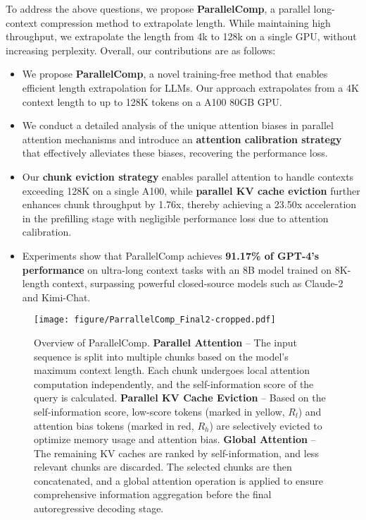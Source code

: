 To address the above questions, we propose \textbf{ParallelComp}, a parallel long-context compression method to extrapolate length. While maintaining high throughput, we extrapolate the length from 4k to 128k on a single GPU, without increasing perplexity. Overall, our contributions are as follows:
\begin{itemize}
    \item  We propose \textbf{ParallelComp}, a novel training-free method that enables efficient length extrapolation for LLMs. Our approach extrapolates from a 4K context length to up to 128K tokens on a A100 80GB GPU.

        \item We conduct a detailed analysis of the unique attention biases in parallel attention mechanisms and introduce an \textbf{attention calibration strategy} that effectively alleviates these biases, recovering the performance loss.
        
         \item Our \textbf{chunk eviction strategy} enables parallel attention to handle contexts exceeding 128K on a single A100, while \textbf{parallel KV cache eviction} further enhances chunk throughput by 1.76x, thereby achieving a 23.50x acceleration in the prefilling stage with negligible performance loss due to attention calibration.
         
     \item Experiments show that ParallelComp achieves \textbf{91.17\% of GPT-4's performance} on ultra-long context tasks with an 8B model trained on 8K-length context, surpassing powerful closed-source models such as Claude-2 and Kimi-Chat.

     

    
   
\end{itemize}

\begin{figure*}[!h]
\vskip 0.2in
\begin{center}
\centerline{\texttt{[image: figure/ParrallelComp\_Final2-cropped.pdf]}}
\caption{Overview of ParallelComp. \textbf{Parallel Attention} – The input sequence is split into multiple chunks based on the model's maximum context length. Each chunk undergoes local attention computation independently, and the self-information score of the query is calculated. \textbf{Parallel KV Cache Eviction} – Based on the self-information score, low-score tokens (marked in yellow, \( R_l \)) and attention bias tokens (marked in red, \( R_h \)) are selectively evicted to optimize memory usage and attention bias. \textbf{Global Attention} – The remaining KV caches are ranked by self-information, and less relevant chunks are discarded. The selected chunks are then concatenated, and a global attention operation is applied to ensure comprehensive information aggregation before the final autoregressive decoding stage.  }
\label{fig:overview}
\end{center}
\vspace{-6mm}
\end{figure*}









